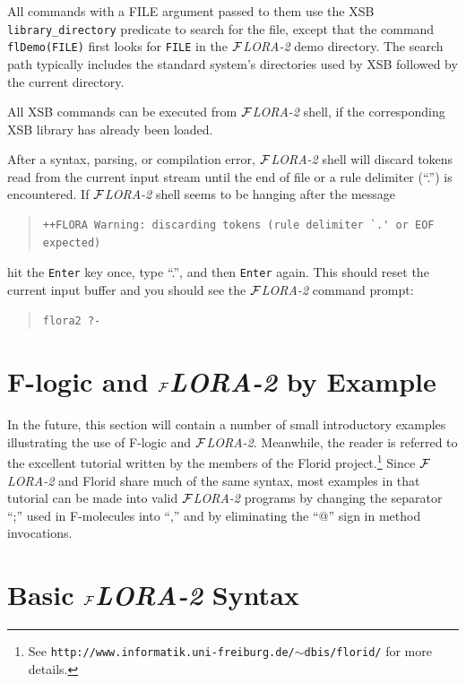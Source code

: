 \documentclass[11pt]{article}
\newcommand{\FLORA}{{\mbox{${\cal F}${\small\it LORA}\rm\emph{-2}}}\xspace}
\newcommand{\FLORID}{{\mbox{\sc Florid}}\xspace}
\newcommand{\fl}{\mbox{F-logic}\xspace}
\begin{document}
All commands with a FILE argument passed to them use the XSB
{\tt library\_directory} predicate to search for the file, except that the
command {\tt flDemo(FILE)} first looks for {\tt FILE} in the \FLORA demo
directory. The search path typically includes the standard system's
directories used by XSB followed by the current directory. 

All XSB commands can be executed from \FLORA shell, if the corresponding
XSB library has already been loaded.

After a syntax, parsing, or compilation error, \FLORA shell will
discard tokens read from the current input stream until the end of file or a
rule delimiter (``.'') is encountered. If \FLORA shell seems to be hanging
after the message
\begin{quote}
\begin{verbatim}
++FLORA Warning: discarding tokens (rule delimiter `.' or EOF expected)
\end{verbatim}
\end{quote}
hit the {\tt Enter} key once, type ``.'', and then {\tt Enter} again.  This
should reset the current input buffer and you should see the \FLORA command
prompt:
\begin{quote}
\begin{verbatim}
flora2 ?-
\end{verbatim}
\end{quote}

 
\section{\fl and \FLORA by Example}


In the future, this section will contain a number of small
introductory examples illustrating the use of \fl and \FLORA. Meanwhile, the
reader is referred to the excellent tutorial written by the members of the
\FLORID project.\footnote{
  See {\tt http://www.informatik.uni-freiburg.de/$\sim$dbis/florid/} for more
  details.
  }
Since \FLORA and \FLORID share much of the same syntax, most examples in that
tutorial can be made into valid \FLORA programs by changing the separator
``;'' used in F-molecules into ``,'' and by eliminating the ``@''
sign in method invocations.



\section{Basic \FLORA Syntax}
\end{document}
